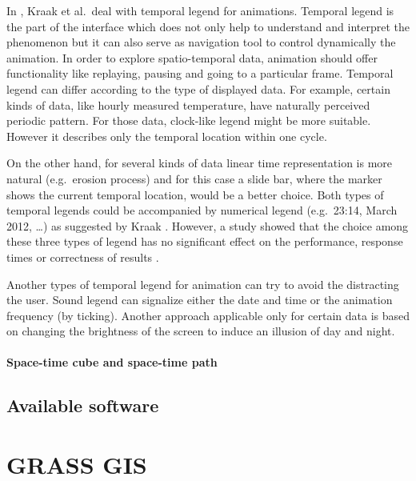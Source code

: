 \documentclass[a4paper,12pt]{book}
\begin{document}

In \cite{kraak1997cartographic}, Kraak et al.\ deal with temporal legend for animations.
Temporal legend is the part of the interface which does not only help to understand and interpret
the phenomenon but it can also serve as navigation tool to control dynamically the animation.
In order to explore spatio-temporal data, animation should offer functionality like replaying, pausing
and going to a particular frame.
Temporal legend can differ according to the type of displayed data.
For example, certain kinds of data, like hourly measured temperature, have naturally perceived periodic pattern.
For those data, clock-like legend might be more suitable.
However it describes only the temporal location within one cycle.

On the other hand, for several kinds of data linear time representation is more natural (e.g.\ erosion process)
and for this case a slide bar, where the marker shows the current temporal location, would be a better choice.
Both types of temporal legends could be accompanied by numerical legend (e.g.\ 23:14,  March 2012, \ldots)
as suggested by Kraak \cite{kraak1997cartographic}.
However, a study showed that the choice among these three types of legend has no significant effect on
the performance, response times or correctness of results \cite{edsall1997assessing}.

Another types of temporal legend for animation can try to avoid the distracting the user.
Sound legend can signalize either the date and time or the animation frequency (by ticking).
Another approach applicable only for certain data is based on changing the brightness of the screen
to induce an illusion of day and night.


\subsubsection{Space-time cube and space-time path}


\section{Available software}

\chapter{GRASS GIS}
\end{document}
